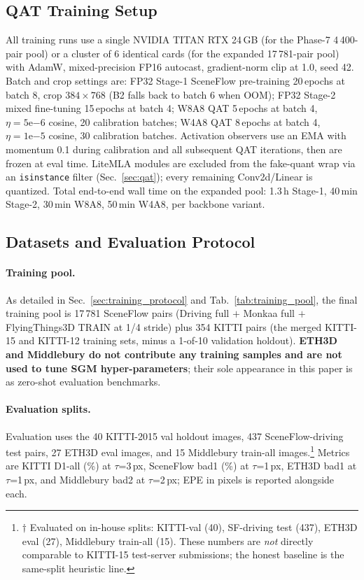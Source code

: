 \documentclass[journal]{IEEEtran}
\begin{document}
\subsection{QAT Training Setup}
\label{sec:qat_setup}
All training runs use a single NVIDIA TITAN RTX 24\,GB (for the Phase-7 4\,400-pair pool) or a cluster of 6 identical cards (for the expanded 17\,781-pair pool) with AdamW, mixed-precision FP16 autocast, gradient-norm clip at 1.0, seed 42. Batch and crop settings are: FP32 Stage-1 SceneFlow pre-training 20\,epochs at batch 8, crop $384\!\times\!768$ (B2 falls back to batch 6 when OOM); FP32 Stage-2 mixed fine-tuning 15\,epochs at batch 4; W8A8 QAT 5\,epochs at batch 4, $\eta\!=\!5\mathrm{e}{-6}$ cosine, 20 calibration batches; W4A8 QAT 8\,epochs at batch 4, $\eta\!=\!1\mathrm{e}{-5}$ cosine, 30 calibration batches. Activation observers use an EMA with momentum 0.1 during calibration and all subsequent QAT iterations, then are frozen at eval time. LiteMLA modules are excluded from the fake-quant wrap via an \texttt{isinstance} filter (Sec.~\ref{sec:qat}); every remaining Conv2d/Linear is quantized. Total end-to-end wall time on the expanded pool: 1.3\,h Stage-1, 40\,min Stage-2, 30\,min W8A8, 50\,min W4A8, per backbone variant.

\subsection{Datasets and Evaluation Protocol}
\label{sec:datasets_eval}
\paragraph{Training pool.} As detailed in Sec.~\ref{sec:training_protocol} and Tab.~\ref{tab:training_pool}, the final training pool is 17\,781 SceneFlow pairs (Driving full $+$ Monkaa full $+$ FlyingThings3D TRAIN at 1/4 stride) plus 354 KITTI pairs (the merged KITTI-15 and KITTI-12 training sets, minus a 1-of-10 validation holdout). \textbf{ETH3D and Middlebury do not contribute any training samples and are not used to tune SGM hyper-parameters}; their sole appearance in this paper is as zero-shot evaluation benchmarks.

\paragraph{Evaluation splits.} Evaluation uses the 40 KITTI-2015 val holdout images, 437 SceneFlow-driving test pairs, 27 ETH3D eval images, and 15 Middlebury train-all images.\footnote{$\dagger$ Evaluated on in-house splits: KITTI-val (40), SF-driving test (437), ETH3D eval (27), Middlebury train-all (15). These numbers are \emph{not} directly comparable to KITTI-15 test-server submissions; the honest baseline is the same-split heuristic line.} Metrics are KITTI D1-all (\%) at $\tau$=3\,px, SceneFlow bad1 (\%) at $\tau$=1\,px, ETH3D bad1 at $\tau$=1\,px, and Middlebury bad2 at $\tau$=2\,px; EPE in pixels is reported alongside each.
\end{document}

